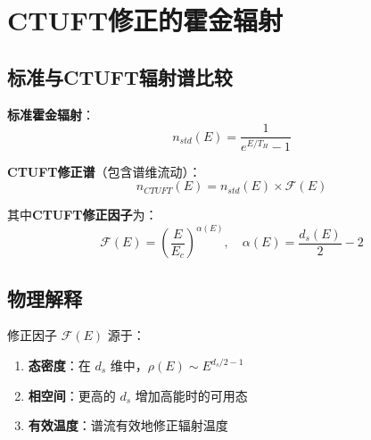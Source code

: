 \section{CTUFT修正的霍金辐射}
\label{sec:modified-hawking}

\subsection{标准与CTUFT辐射谱比较}
\label{subsec:spectrum-comparison}

\textbf{标准霍金辐射}：
\begin{equation}
n_{std}(E) = \frac{1}{e^{E/T_H} - 1}
\label{eq:standard-hawking}
\end{equation}

\textbf{CTUFT修正谱}（包含谱维流动）：
\begin{equation}
n_{CTUFT}(E) = n_{std}(E) \times \mathcal{F}(E)
\label{eq:ctuft-hawking}
\end{equation}

其中\textbf{CTUFT修正因子}为：
\begin{equation}
\mathcal{F}(E) = \left(\frac{E}{E_c}\right)^{\alpha(E)}, \quad \alpha(E) = \frac{d_s(E)}{2} - 2
\label{eq:correction-factor}
\end{equation}

\subsection{物理解释}
\label{subsec:physical-interpretation}

修正因子 $\mathcal{F}(E)$ 源于：
\begin{enumerate}
    \item \textbf{态密度}：在 $d_s$ 维中，$\rho(E) \sim E^{d_s/2 - 1}$
    \item \textbf{相空间}：更高的 $d_s$ 增加高能时的可用态
    \item \textbf{有效温度}：谱流有效地修正辐射温度
\end{enumerate}

